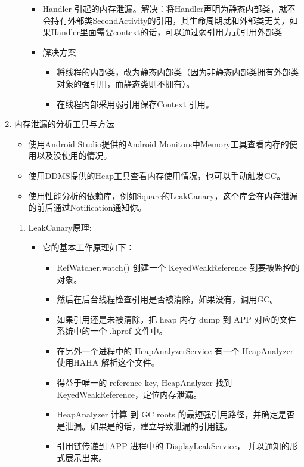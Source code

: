 \documentclass[9pt, b5paper]{article}
\begin{document}
\begin{enumerate}
\begin{itemize}
\begin{itemize}
\item Handler 引起的内存泄漏。解决：将Handler声明为静态内部类，就不会持有外部类SecondActivity的引用，其生命周期就和外部类无关，如果Handler里面需要context的话，可以通过弱引用方式引用外部类
\item 解决方案
\begin{itemize}
\item 将线程的内部类，改为静态内部类（因为非静态内部类拥有外部类对象的强引用，而静态类则不拥有）。
\item 在线程内部采用弱引用保存Context 引用。
\end{itemize}
\end{itemize}
\end{itemize}
\item 内存泄漏的分析工具与方法
\label{sec-1-1-7-2}
\begin{itemize}
\item 使用Android Studio提供的Android Monitors中Memory工具查看内存的使用以及没使用的情况。
\item 使用DDMS提供的Heap工具查看内存使用情况，也可以手动触发GC。
\item 使用性能分析的依赖库，例如Square的LeakCanary，这个库会在内存泄漏的前后通过Notification通知你。
\end{itemize}
\begin{enumerate}
\item LeakCanary原理:
\label{sec-1-1-7-2-1}
\begin{itemize}
\item 它的基本工作原理如下：
\begin{itemize}
\item RefWatcher.watch() 创建一个 KeyedWeakReference 到要被监控的对象。
\item 然后在后台线程检查引用是否被清除，如果没有，调用GC。
\item 如果引用还是未被清除，把 heap 内存 dump 到 APP 对应的文件系统中的一个 .hprof 文件中。
\item 在另外一个进程中的 HeapAnalyzerService 有一个 HeapAnalyzer 使用HAHA 解析这个文件。
\item 得益于唯一的 reference key, HeapAnalyzer 找到 KeyedWeakReference，定位内存泄漏。
\item HeapAnalyzer 计算 到 GC roots 的最短强引用路径，并确定是否是泄漏。如果是的话，建立导致泄漏的引用链。
\item 引用链传递到 APP 进程中的 DisplayLeakService， 并以通知的形式展示出来。
\end{itemize}

\end{itemize}
\end{enumerate}
\end{enumerate}
\end{document}

